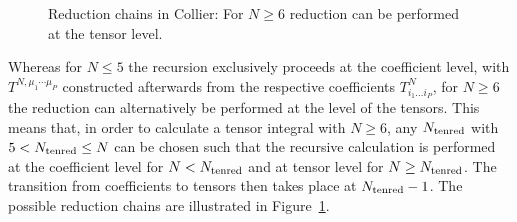 \documentclass[preprint,sort&compress,12pt]{elsarticle}
\def\reffi#1{\mbox{Figure~\ref{#1}}}
\newcommand{\collier}{{\sc Collier}}
\begin{document}
\begin{figure}[t]
\caption{Reduction chains in {\collier}: For $N\ge 6$ reduction can be
         performed at the tensor level.\label{fig:RedChains}}
\end{figure}

Whereas for $N\le 5$ the recursion exclusively proceeds 
at the coefficient level, 
with $T^{N,\mu_1\cdots\mu_{P}}$ 
constructed afterwards from the respective 
coefficients $T^N_{i_1\ldots i_P}$,
for $N\ge 6$ 
the reduction can alternatively be performed at the level of the tensors.
This means that, in order to calculate a tensor integral with $N\ge 6$,
any $N_{\rm tenred}$ with $5< N_{\rm tenred}\le N$ can be chosen such
that the recursive calculation is performed at the coefficient level for 
$N<N_{\rm tenred}$ and at tensor level for $N\ge N_{\rm tenred}$.
The transition from coefficients to tensors then takes place at $N_{\rm tenred}-1$.
The possible reduction chains are illustrated in \reffi{fig:RedChains}.
\end{document}

